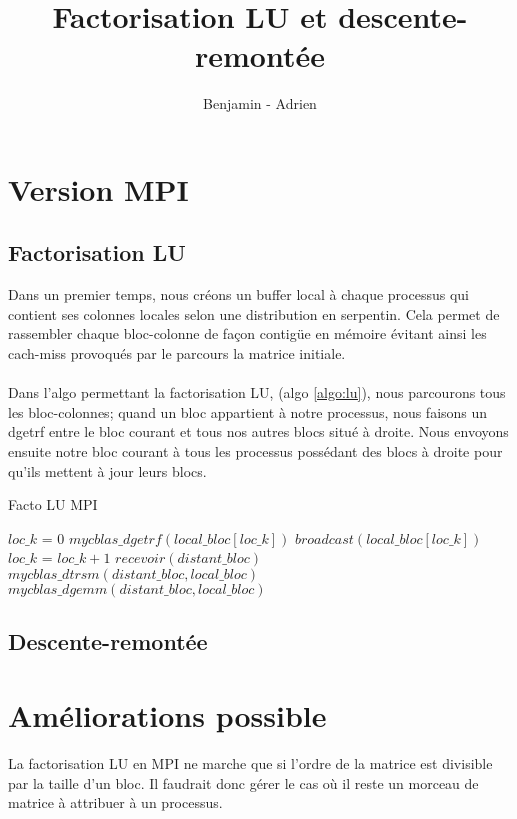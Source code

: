 \documentclass{article}
\title{Factorisation LU et descente-remontée}
\author{Benjamin \bsc{Angelaud} - Adrien \bsc{Guilbaud}}
\begin{document}
\maketitle

\section{Version MPI}
\subsection{Factorisation LU}
Dans un premier temps, nous créons un buffer local à chaque processus qui contient ses colonnes locales selon une distribution en serpentin. Cela permet de rassembler chaque bloc-colonne de façon contigüe en mémoire évitant ainsi les cach-miss provoqués par le parcours la matrice initiale.

\paragraph{}
Dans l'algo permettant la factorisation LU, (algo \ref{algo:lu}), nous parcourons tous les bloc-colonnes; quand un bloc appartient à notre processus, nous faisons un dgetrf entre le bloc courant et tous nos autres blocs situé à droite. Nous envoyons ensuite notre bloc courant à tous les processus possédant des blocs à droite pour qu'ils mettent à jour leurs blocs. 

\begin{algorithm}
  \caption{Facto LU MPI}\label{algo:lu}
  \begin{algorithmic}[1]
    \State $ loc\_k $ = $ 0 $
    \State $ mycblas\_dgetrf(local\_bloc[loc\_k]) $
    \State $ broadcast(local\_bloc[loc\_k]) $
    \State $ loc\_k $ = $ loc\_k + 1 $
    \Else
    \State $ recevoir(distant\_bloc) $
    \State $ mycblas\_dtrsm(distant\_bloc, local\_bloc) $
    \State $ mycblas\_dgemm(distant\_bloc, local\_bloc) $
    \EndIf
    \EndFor

  \end{algorithmic}
\end{algorithm}


\subsection{Descente-remontée}

\section{Améliorations possible}
La factorisation LU en MPI ne marche que si l'ordre de la matrice est divisible par la taille d'un bloc. Il faudrait donc gérer le cas où il reste un morceau de matrice à attribuer à un processus.
\end{document}
